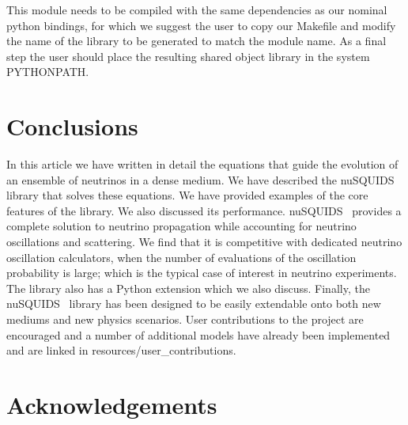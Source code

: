 \documentclass[3p,12pt]{elsarticle}
\newcommand{\ttf}{\ttfamily}
\newcommand{\nuSQUIDS}{{\ttfamily nuSQUIDS}}
\begin{document}
This module needs to be compiled with the same dependencies as our nominal python bindings, for which we suggest the user
to copy our Makefile and modify the name of the library to be generated to match the module name. As a final step the user
should place the resulting shared object library in the system {\ttf PYTHONPATH}.

\section{Conclusions}
\label{sec:conclu}

In this article we have written in detail the equations that guide the evolution of an ensemble of neutrinos
in a dense medium. We have described the \nuSQUIDS~ library that solves these equations. We have provided examples
of the core features of the library. We also discussed its performance.
\nuSQUIDS~  provides a complete solution to neutrino propagation while accounting for neutrino oscillations and scattering. 
We find that it is competitive with dedicated neutrino oscillation calculators, when the number of evaluations of the oscillation probability
is large; which is the typical case of interest in neutrino experiments.
The library also has a {\ttf Python} extension which we also discuss. Finally, the \nuSQUIDS~ library has been designed to be easily extendable 
onto both new mediums and new physics scenarios. User contributions to the project are encouraged and a number of additional
models have already been implemented and are linked in {\ttf resources/user\_contributions}.

\section*{Acknowledgements}
\end{document}
